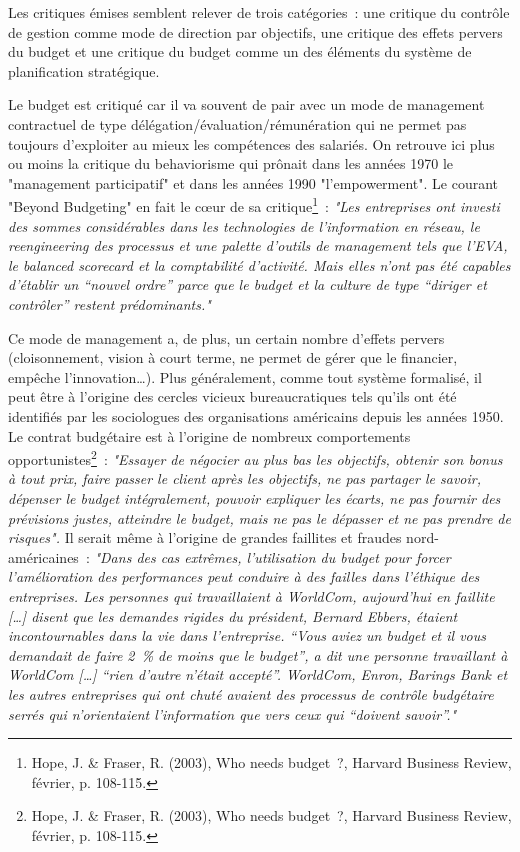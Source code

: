 \documentclass[oneside]{kaobook}
\begin{document}
Les critiques émises semblent relever de trois catégories : une critique du contrôle de gestion comme mode de direction par objectifs, une critique des effets pervers du budget et une critique du budget comme un des éléments du système de planification stratégique.

Le budget est critiqué car il va souvent de pair avec un mode de management contractuel de type délégation/évaluation/rémunération qui ne permet pas toujours d'exploiter au mieux les compétences des salariés. On retrouve ici plus ou moins la critique du behaviorisme qui prônait dans les années 1970 le "management participatif" et dans les années 1990 "l'empowerment". Le courant "Beyond Budgeting" en fait le cœur de sa critique\footnote{Hope, J. \& Fraser, R. (2003), Who needs budget ?, Harvard Business Review, février, p. 108-115.} : 
\emph{"Les entreprises ont investi des sommes considérables dans les technologies de l'information en réseau, le reengineering des processus et une palette d'outils de management tels que l'EVA, le balanced scorecard et la comptabilité d'activité. Mais elles n'ont pas été capables d'établir un “nouvel ordre” parce que le budget et la culture de type “diriger et contrôler” restent prédominants."}

Ce mode de management a, de plus, un certain nombre d'effets pervers (cloisonnement, vision à court terme, ne permet de gérer que le financier, empêche l'innovation\ldots{}). Plus généralement, comme tout système formalisé, il peut être à l'origine des cercles vicieux bureaucratiques tels qu'ils ont été identifiés par les sociologues des organisations américains depuis les années 1950. Le contrat budgétaire est à l'origine de nombreux comportements opportunistes\footnote{Hope, J. \& Fraser, R. (2003), Who needs budget ?, Harvard Business Review, février, p. 108-115.} : \emph{"Essayer de négocier au plus bas les objectifs, obtenir son bonus à tout prix, faire passer le client après les objectifs, ne pas partager le savoir, dépenser le budget intégralement, pouvoir expliquer les écarts, ne pas fournir des prévisions justes, atteindre le budget, mais ne pas le dépasser et ne pas prendre de risques".} Il serait même à l'origine de grandes faillites et fraudes nord-américaines : \emph{"Dans des cas extrêmes, l'utilisation du budget pour forcer l'amélioration des performances peut conduire à des failles dans l'éthique des entreprises. Les personnes qui travaillaient à WorldCom, aujourd'hui en faillite [\ldots{}] disent que les demandes rigides du président, Bernard Ebbers, étaient incontournables dans la vie dans l'entreprise. “Vous aviez un budget et il vous demandait de faire 2 \% de moins que le budget”, a dit une personne travaillant à WorldCom [\ldots{}] “rien d'autre n'était accepté”. WorldCom, Enron, Barings Bank et les autres entreprises qui ont chuté avaient des processus de contrôle budgétaire serrés qui n'orientaient l'information que vers ceux qui “doivent savoir”."}
\end{document}
